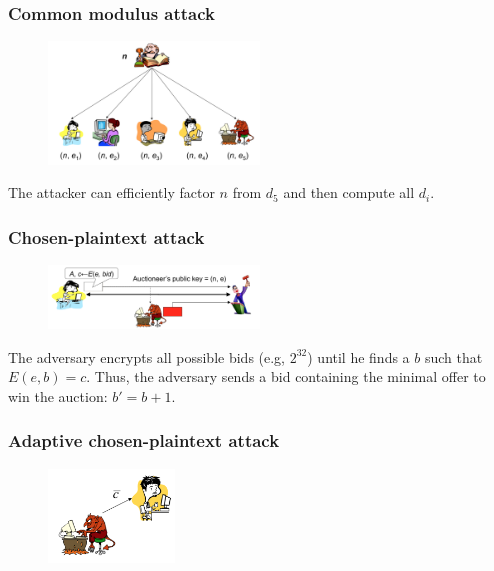 \documentclass[a4paper,12pt]{article}
\begin{document}
\subsubsection{Common modulus attack}

\begin{figure}[H]
  \centering
  \includegraphics[width=0.5\textwidth]{img/common-modulus-attack}
\end{figure}

The attacker can efficiently factor $n$ from $d_5$ and then compute all $d_i$.

\subsubsection{Chosen-plaintext attack}

\begin{figure}[H]
  \centering
  \includegraphics[width=0.5\textwidth]{img/chosen-plaintext-attack}
\end{figure}

The adversary encrypts all possible bids (e.g, $2^{32}$) until he finds a $b$ such that $E(e, b) = c$. Thus, the adversary sends a bid containing the minimal offer to win the auction: $b' = b + 1$.

\subsubsection{Adaptive chosen-plaintext attack}

\begin{figure}[H]
  \centering
  \includegraphics[width=0.3\textwidth]{img/chosen-ciphertext-attack}
\end{figure}
\end{document}
